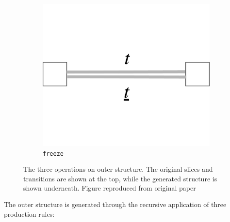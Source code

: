 \documentclass[12pt,a4paper,twoside,openany]{report} \usepackage[pdfborder={0 0 0}]{hyperref}    %
\theoremstyle{definition} \newtheorem{definition}{Definition}[section]
\begin{document}
\begin{figure}[ht]
\begin{subfigure}[t]{.20\textwidth}
    \includegraphics[keepaspectratio,width=\textwidth]{prep/outer/freeze} \caption{\texttt{freeze}}
    \label{fig:freezeOp} 
      \end{subfigure} 
    \centering 
    \captionsetup{width=.9\linewidth} 
    \caption{\small The three operations on outer structure. The original slices and transitions are shown at the top, while the generated structure is shown underneath. Figure reproduced from original paper \cite{finkensiepStructureFreePolyphony2023}}
\label{fig:outerOperations} 
\end{figure}

    The outer structure is generated through the recursive application of three production rules:
\end{document}
